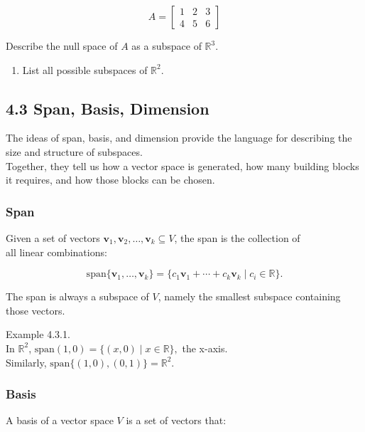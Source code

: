 \documentclass[
  12pt,
  a4paper,
]{article}
\begin{document}
\[A = \begin{bmatrix}
1 & 2 & 3 \\
4 & 5 & 6
\end{bmatrix}\]

Describe the null space of \(A\) as a subspace of \(\mathbb{R}^3\).

\begin{enumerate}
\def\labelenumi{\arabic{enumi}.}
\item
  List all possible subspaces of \(\mathbb{R}^2\).
\end{enumerate}

\subsection{4.3 Span, Basis, Dimension}\label{43-span-basis-dimension}

The ideas of span, basis, and dimension provide the language for
describing the size and structure of subspaces.\\
Together, they tell us how a vector space is generated, how many
building blocks it requires, and how those blocks can be chosen.

\subsubsection{Span}\label{span}

Given a set of vectors
\({\mathbf{v}_1, \mathbf{v}_2, \dots, \mathbf{v}_k} \subseteq V\), the
span is the collection of\\
all linear combinations:

\[\text{span}\{\mathbf{v}_1, \dots, \mathbf{v}_k\} = \{ c_1\mathbf{v}_1 + \cdots + c_k\mathbf{v}_k \mid c_i \in \mathbb{R} \}.\]

The span is always a subspace of \(V\), namely the smallest subspace
containing those vectors.

Example 4.3.1.\\
In \(\mathbb{R}^2\),
\( \text{span}{(1,0)} = \{(x,0) \mid x \in \mathbb{R}\},\) the x-axis.\\
Similarly, \(\text{span}\{(1,0),(0,1)\} = \mathbb{R}^2.\)

\subsubsection{Basis}\label{basis}

A basis of a vector space \(V\) is a set of vectors that:
\end{document}
